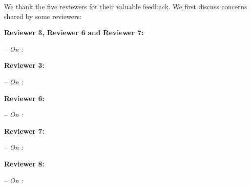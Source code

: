 \documentclass{article}
\begin{document}
We thank the five reviewers for their valuable feedback. We first discuss concerns shared by some reviewers:
\vspace{-2pt}

\textbf{Reviewer 3, Reviewer 6 and Reviewer 7:} \vspace{-5pt}

-- \textit{On :} 


\textbf{Reviewer 3:} \vspace{-5pt}

-- \textit{On :} 


\textbf{Reviewer 6:} \vspace{-5pt}

-- \textit{On :} 


\textbf{Reviewer 7:} \vspace{-5pt}

-- \textit{On :} 


\textbf{Reviewer 8:} \vspace{-5pt}

-- \textit{On :} 
\end{document}
